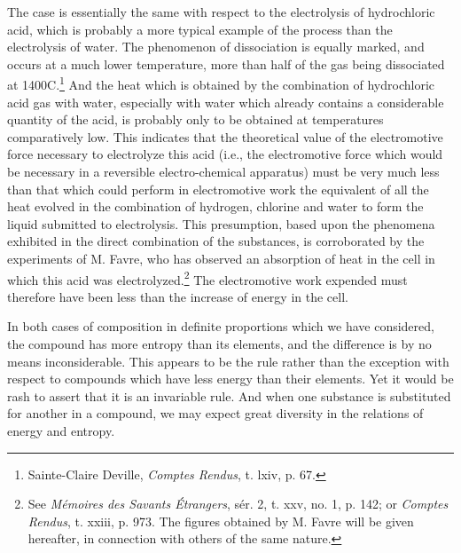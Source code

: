 \documentclass[12pt]{memoir}
\begin{document}
The case is essentially the same with respect to the electrolysis of hydrochloric acid, which is probably a more typical example of the process than the electrolysis of water. The phenomenon of dissociation is equally marked, and occurs at a much lower temperature, more than half of the gas being dissociated at 1400\degree C.\footnote{Sainte-Claire Deville, \textit{Comptes Rendus}, t. lxiv, p. 67.} And the heat which is obtained by the combination of hydrochloric acid gas with water, especially with water which already contains a considerable quantity of the acid, is probably only to be obtained at temperatures comparatively low. This indicates that the theoretical value of the electromotive force necessary to electrolyze this acid (i.e., the electromotive force which would be necessary in a reversible electro-chemical apparatus) must be very much less than that which could perform in electromotive work the equivalent of all the heat evolved in the combination of hydrogen, chlorine and water to form the liquid submitted to electrolysis. This presumption, based upon the phenomena exhibited in the direct combination of the substances, is corroborated by the experiments of M. Favre, who has observed an absorption of heat in the cell in which this acid was electrolyzed.\footnote{See \textit{M\'{e}moires des Savants \'{E}trangers}, s\'{e}r. 2, t. xxv, no. 1, p. 142; or \textit{Comptes Rendus}, t. xxiii, p. 973. The figures obtained by M. Favre will be given hereafter, in connection with others of the same nature.} The electromotive work expended must therefore have been less than the increase of energy in the cell.

In both cases of composition in definite proportions which we have considered, the compound has more entropy than its elements, and the difference is by no means inconsiderable. This appears to be the rule rather than the exception with respect to compounds which have less energy than their elements. Yet it would be rash to assert that it is an invariable rule. And when one substance is substituted for another in a compound, we may expect great diversity in the relations of energy and entropy.
\end{document}
